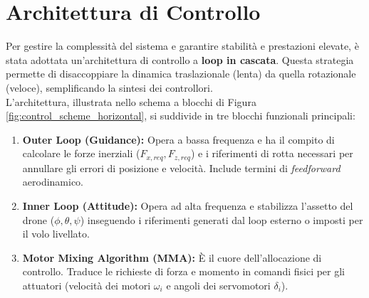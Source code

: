 \section{Architettura di Controllo}
Per gestire la complessità del sistema e garantire stabilità e prestazioni elevate, è stata adottata un'architettura di controllo a \textbf{loop in cascata}. Questa strategia permette di disaccoppiare la dinamica traslazionale (lenta) da quella rotazionale (veloce), semplificando la sintesi dei controllori.
\\L'architettura, illustrata nello schema a blocchi di Figura \ref{fig:control_scheme_horizontal}, si suddivide in tre blocchi funzionali principali:
\begin{enumerate}
    \item \textbf{Outer Loop (Guidance):} Opera a bassa frequenza e ha il compito di calcolare le forze inerziali ($F_{x,req}, F_{z,req}$) e i riferimenti di rotta necessari per annullare gli errori di posizione e velocità. Include termini di \textit{feedforward} aerodinamico.
    \item \textbf{Inner Loop (Attitude):} Opera ad alta frequenza e stabilizza l'assetto del drone ($\phi, \theta, \psi$) inseguendo i riferimenti generati dal loop esterno o imposti per il volo livellato.
    \item \textbf{Motor Mixing Algorithm (MMA):} È il cuore dell'allocazione di controllo. Traduce le richieste di forza e momento in comandi fisici per gli attuatori (velocità dei motori $\omega_i$ e angoli dei servomotori $\delta_i$).
\end{enumerate}

